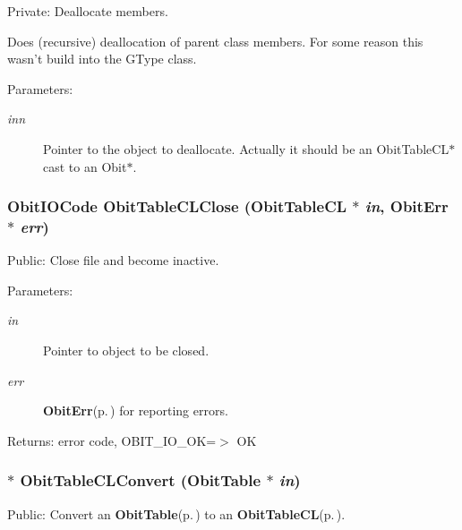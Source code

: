 Private: Deallocate members. 

Does (recursive) deallocation of parent class members. For some reason this wasn't build into the GType class. \begin{Desc}
\item[Parameters:]
\begin{description}
\item[{\em inn}]Pointer to the object to deallocate. Actually it should be an Obit\-Table\-CL$\ast$ cast to an Obit$\ast$. \end{description}
\end{Desc}
\subsubsection{\setlength{\rightskip}{0pt plus 5cm}Obit\-IOCode Obit\-Table\-CLClose ({\bf Obit\-Table\-CL} $\ast$ {\em in}, {\bf Obit\-Err} $\ast$ {\em err})}\label{ObitTableCL_8c_a25}


Public: Close file and become inactive. 

\begin{Desc}
\item[Parameters:]
\begin{description}
\item[{\em in}]Pointer to object to be closed. \item[{\em err}]{\bf Obit\-Err}{\rm (p.\,\pageref{structObitErr})} for reporting errors. \end{description}
\end{Desc}
\begin{Desc}
\item[Returns:]error code, OBIT\_\-IO\_\-OK=$>$ OK \end{Desc}
\subsubsection{$\ast$ Obit\-Table\-CLConvert ({\bf Obit\-Table} $\ast$ {\em in})}\label{ObitTableCL_8c_a19}


Public: Convert an {\bf Obit\-Table}{\rm (p.\,\pageref{structObitTable})} to an {\bf Obit\-Table\-CL}{\rm (p.\,\pageref{structObitTableCL})}. 

